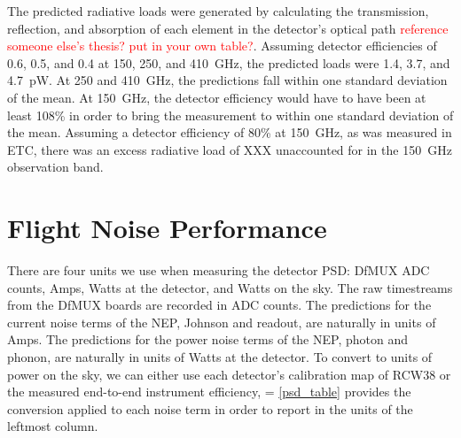 The predicted radiative loads were generated by calculating the transmission, reflection, and absorption of each element in the detector's optical path \textcolor{red}{reference someone else's thesis? put in your own table?}. 
Assuming detector efficiencies of 0.6, 0.5, and 0.4 at 150, 250, and 410~GHz, the predicted loads were 1.4, 3.7, and 4.7~pW.
At 250 and 410~GHz, the predictions fall within one standard deviation of the mean. 
At 150~GHz, the detector efficiency would have to have been at least 108\% in order to bring the measurement to within one standard deviation of the mean. 
Assuming a detector efficiency of 80\% at 150~GHz, as was measured in \ac{ETC}, there was an excess radiative load of XXX unaccounted for in the 150~GHz observation band. 




\section{Flight Noise Performance}
\label{sec:flight_noise_performance}

There are four units we use when measuring the detector \ac{PSD}: \ac{DfMUX} \ac{ADC} counts, Amps, Watts at the detector, and Watts on the sky. 
The raw timestreams from the \ac{DfMUX} boards are recorded in \ac{ADC} counts. 
The predictions for the current noise terms of the \ac{NEP}, Johnson and readout, are naturally in units of Amps.
The predictions for the power noise terms of the \ac{NEP}, photon and phonon, are naturally in units of Watts at the detector. 
To convert to units of power on the sky, we can either use each detector's calibration map of RCW38 or the measured end-to-end instrument efficiency, 
\be
\varepsilon = 
\label{eq:eff_ratio}
\ee
\TAB\ref{psd_table} provides the conversion applied to each noise term in order to report in the units of the leftmost column. 

